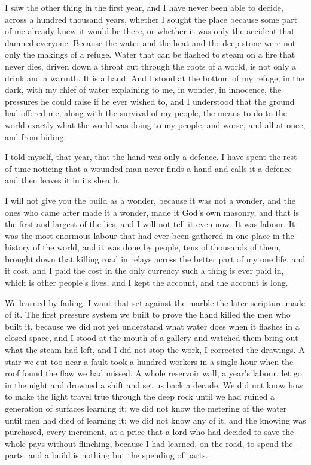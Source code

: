 I saw the other thing in the first year, and I have never been able to decide, across a hundred thousand years, whether I sought the place because some part of me already knew it would be there, or whether it was only the accident that damned everyone. Because the water and the heat and the deep stone were not only the makings of a refuge. Water that can be flashed to steam on a fire that never dies, driven down a throat cut through the roots of a world, is not only a drink and a warmth. It is a hand. And I stood at the bottom of my refuge, in the dark, with my chief of water explaining to me, in wonder, in innocence, the pressures he could raise if he ever wished to, and I understood that the ground had offered me, along with the survival of my people, the means to do to the world exactly what the world was doing to my people, and worse, and all at once, and from hiding.\par

I told myself, that year, that the hand was only a defence. I have spent the rest of time noticing that a wounded man never finds a hand and calls it a defence and then leaves it in its sheath.\par

\ornament

I will not give you the build as a wonder, because it was not a wonder, and the ones who came after made it a wonder, made it God's own masonry, and that is the first and largest of the lies, and I will not tell it even now. It was labour. It was the most enormous labour that had ever been gathered in one place in the history of the world, and it was done by people, tens of thousands of them, brought down that killing road in relays across the better part of my one life, and it cost, and I paid the cost in the only currency such a thing is ever paid in, which is other people's lives, and I kept the account, and the account is long.\par

We learned by failing. I want that set against the marble the later scripture made of it. The first pressure system we built to prove the hand killed the men who built it, because we did not yet understand what water does when it flashes in a closed space, and I stood at the mouth of a gallery and watched them bring out what the steam had left, and I did not stop the work, I corrected the drawings. A stair we cut too near a fault took a hundred workers in a single hour when the roof found the flaw we had missed. A whole reservoir wall, a year's labour, let go in the night and drowned a shift and set us back a decade. We did not know how to make the light travel true through the deep rock until we had ruined a generation of surfaces learning it; we did not know the metering of the water until men had died of learning it; we did not know any of it, and the knowing was purchased, every increment, at a price that a lord who had decided to save the whole pays without flinching, because I had learned, on the road, to spend the parts, and a build is nothing but the spending of parts.\par

